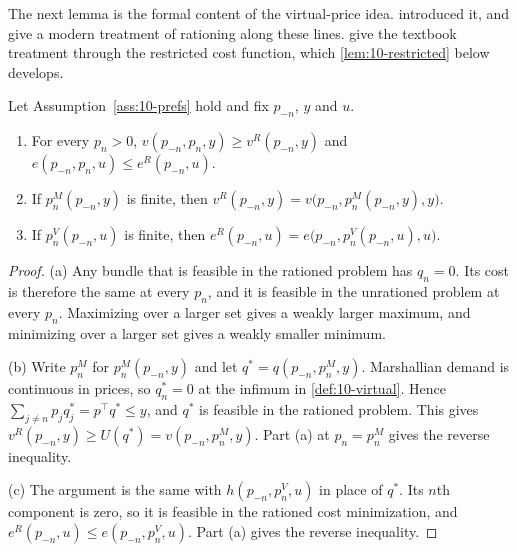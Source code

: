 The next lemma is the formal content of the virtual-price idea. \citet{Rothbarth1941} introduced it, and
\citet{NearyRoberts1980} give a modern treatment of rationing along these lines. \citet[Section~4.3,
pp.~109--113]{DeatonMuellbauer1980b} give the textbook treatment through the restricted cost function, which
\cref{lem:10-restricted} below develops.

\begin{lemma}\label{lem:10-rothbarth}
Let Assumption~\ref{ass:10-prefs} hold and fix $p_{-n}$, $y$ and $u$.
\begin{enumerate}[label=(\alph*)]
  \item For every $p_n > 0$, $v(p_{-n},p_n,y) \ge v^R(p_{-n},y)$ and $e(p_{-n},p_n,u) \le e^R(p_{-n},u)$.
  \item If $p_n^M(p_{-n},y)$ is finite, then $v^R(p_{-n},y) = v\bigl(p_{-n},p_n^M(p_{-n},y),y\bigr)$.
  \item If $p_n^V(p_{-n},u)$ is finite, then $e^R(p_{-n},u) = e\bigl(p_{-n},p_n^V(p_{-n},u),u\bigr)$.
\end{enumerate}
\end{lemma}

\begin{proof}
(a) Any bundle that is feasible in the rationed problem has $q_n = 0$. Its cost is therefore the same at
every $p_n$, and it is feasible in the unrationed problem at every $p_n$. Maximizing over a larger set gives
a weakly larger maximum, and minimizing over a larger set gives a weakly smaller minimum.

(b) Write $p_n^M$ for $p_n^M(p_{-n},y)$ and let $q^* = q(p_{-n},p_n^M,y)$. Marshallian demand is continuous
in prices, so $q_n^* = 0$ at the infimum in \cref{def:10-virtual}. Hence
$\sum_{j\neq n}p_jq_j^* = p^\top q^* \le y$, and $q^*$ is feasible in the rationed problem. This gives
$v^R(p_{-n},y) \ge U(q^*) = v(p_{-n},p_n^M,y)$. Part (a) at $p_n = p_n^M$ gives the reverse inequality.

(c) The argument is the same with $h(p_{-n},p_n^V,u)$ in place of $q^*$. Its $n$th component is zero, so it
is feasible in the rationed cost minimization, and $e^R(p_{-n},u) \le e(p_{-n},p_n^V,u)$. Part (a) gives the
reverse inequality.
\end{proof}

